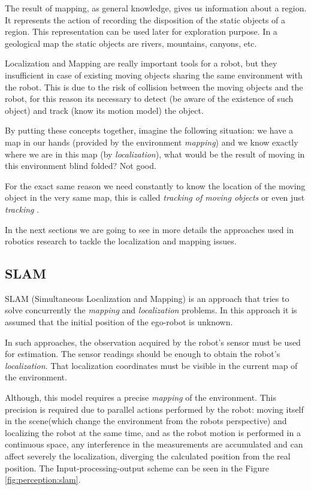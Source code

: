 The result of mapping, as general knowledge, gives us information about a region. It represents the action of recording the disposition of the static objects of a region. This representation can be used later for exploration purpose. In a geological map the static objects are rivers, mountains, canyons, etc. 

Localization and Mapping are really important tools for a robot, but they insufficient in case of existing moving objects sharing the same environment with the robot. This is due to the risk of collision between the moving objects and the robot, for this reason its necessary to detect (be aware of the existence of such object) and track (know its motion model) the object.

By putting these concepts together, imagine the following situation: we have a map in our hands (provided by the environment \textit{mapping}) and we know exactly where we are in this map (by \textit{localization}), what would be the result of moving in this environment blind folded? Not good.

For the exact same reason we need constantly to know the location of the moving object in the very same map, this is called \textit{tracking of moving objects} or even just \textit{tracking} \cite{Wang04a}.

In the next sections we are going to see in more details the approaches used in robotics research to tackle the localization and mapping issues.

\subsection{SLAM}

SLAM (Simultaneous Localization and Mapping) is an approach that tries to solve concurrently the \textit{mapping} and \textit{localization} problems\cite{VU-2009-454238}. In this approach it is assumed that the initial position of the ego-robot is unknown. 

In such approaches, the observation acquired by the robot's sensor must be used for estimation. The sensor readings should be enough to obtain the robot's \textit{localization}. That localization coordinates must be visible in the current map of the environment. 

Although, this model requires a precise \textit{mapping} of the environment. This precision is required due to parallel actions performed by the robot: moving itself in the scene(which change the environment from the robots perspective) and localizing the robot at the same time, and as the robot motion is performed in a continuous space, any interference in the measurements are accumulated and can affect severely the localization, diverging the calculated position from the real position. The Input-processing-output scheme can be seen in the Figure \ref{fig:perception:slam}.

